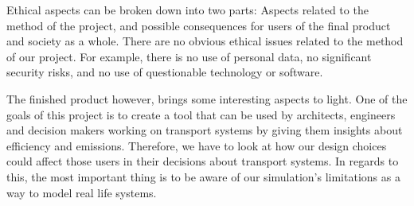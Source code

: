 
Ethical aspects can be broken down into two parts: Aspects related to the method of the project, and possible consequences for users of the final product and society as a whole. There are no obvious ethical issues related to the method of our project. For example, there is no use of personal data, no significant security risks, and no use of questionable technology or software.

The finished product however, brings some interesting aspects to light. One of the goals of this project is to create a tool that can be used by architects, engineers and decision makers working on transport systems by giving them insights about efficiency and emissions. Therefore, we have to look at how our design choices could affect those users in their decisions about transport systems. In regards to this, the most important thing is to be aware of our simulation's limitations as a way to model real life systems.
